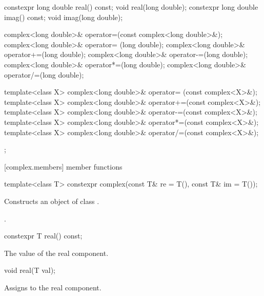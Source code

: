 \begin{codeblock}
{{    constexpr long double real() const;
    void real(long double);
    constexpr long double imag() const;
    void imag(long double);

    complex<long double>& operator=(const complex<long double>&);
    complex<long double>& operator= (long double);
    complex<long double>& operator+=(long double);
    complex<long double>& operator-=(long double);
    complex<long double>& operator*=(long double);
    complex<long double>& operator/=(long double);

    template<class X> complex<long double>& operator= (const complex<X>&);
    template<class X> complex<long double>& operator+=(const complex<X>&);
    template<class X> complex<long double>& operator-=(const complex<X>&);
    template<class X> complex<long double>& operator*=(const complex<X>&);
    template<class X> complex<long double>& operator/=(const complex<X>&);
  };
}
\end{codeblock}

[complex.members]{ member functions}

%
\begin{itemdecl}
template<class T> constexpr complex(const T& re = T(), const T& im = T());
\end{itemdecl}

\begin{itemdescr}
\pnum
\effects
Constructs an object of class
.

\pnum
\postcondition
{}.
\end{itemdescr}

%
%
\begin{itemdecl}
constexpr T real() const;
\end{itemdecl}

\begin{itemdescr}
\returns The value of the real component.
\end{itemdescr}

%
%
\begin{itemdecl}
void real(T val);
\end{itemdecl}

\begin{itemdescr}
\effects Assigns  to the real component.
\end{itemdescr}

